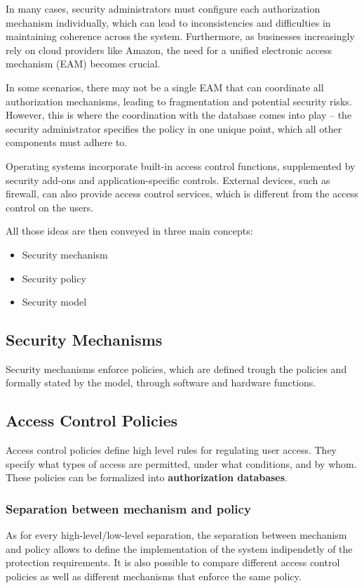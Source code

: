 In many cases, security administrators must configure each
authorization mechanism individually, which can lead to
inconsistencies and difficulties in maintaining coherence across the
system. Furthermore, as businesses increasingly rely on cloud
providers like Amazon, the need for a unified electronic access
mechanism (EAM) becomes crucial.

In some scenarios, there may not be a single EAM that can coordinate
all authorization mechanisms, leading to fragmentation and potential
security risks. However, this is where the coordination with the
database comes into play – the security administrator specifies the
policy in one unique point, which all other components must adhere to.

Operating systems incorporate built-in access control functions,
supplemented by security add-ons and application-specific controls.
External devices, such as firewall, can also provide access control
services, which is different from the access control on the users. 

All those ideas are then conveyed in three main concepts:
\begin{itemize}
  \item Security mechanism
  \item Security policy
  \item Security model
\end{itemize}
\subsection{Security Mechanisms}
Security mechanisms enforce policies, which are defined trough the
policies and formally stated by the model, through software and
hardware functions.

\subsection{Access Control Policies}
Access control policies define high level rules for regulating user
access. They specify what types of access are permitted, under what
conditions, and by whom. These policies can be formalized into
\textbf{authorization databases}.

\subsubsection{Separation between mechanism and policy}
As for every high-level/low-level separation, the separation between
mechanism and policy allows to define the implementation of the system
indipendetly of the protection requirements. 
It is also possible to compare different access control policies as
well as  different mechanisms that enforce the same policy.

